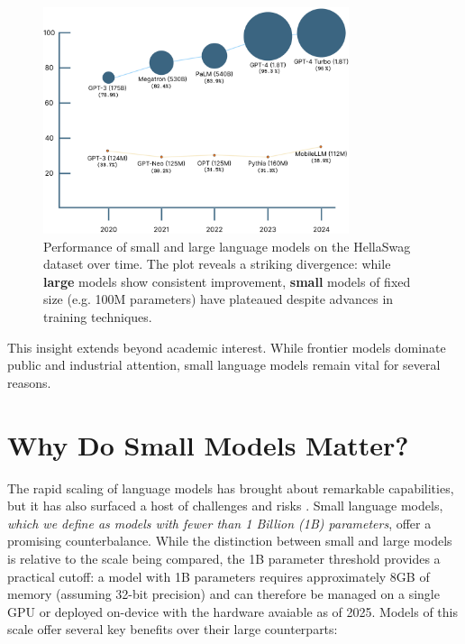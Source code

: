 \begin{figure}[htbp]
    \centering
    \includegraphics[width=0.8\textwidth]{chapters/introduction/figures/lm_performance_comparison.pdf}
    \caption{Performance of small and large language models on the HellaSwag dataset over time. The plot reveals a striking divergence: while \textbf{\textcolor[HTML]{37718E}{large}} models show consistent improvement, \textbf{\textcolor[HTML]{FF7F11}{small}} models of fixed size (e.g. 100M parameters) have plateaued despite advances in training techniques.}
    \label{fig:model_size_vs_performance}
\end{figure}

This insight extends beyond academic interest. While frontier models dominate public and industrial attention, small language models remain vital for several reasons. %

\section*{Why Do Small Models Matter?}


The rapid scaling of language models has brought about remarkable capabilities, but it has also surfaced a host of challenges and risks \citep{bommasani2021foundation}. Small language models, \textit{which we define as models with fewer than 1 Billion (1B) parameters}, offer a promising counterbalance. While the distinction between small and large models is relative to the scale being compared, the 1B parameter threshold provides a practical cutoff: a model with 1B parameters requires approximately 8GB of memory (assuming 32-bit precision) and can therefore be managed on a single GPU or deployed on-device with the hardware avaiable as of 2025. Models of this scale offer several key benefits over their large counterparts:

